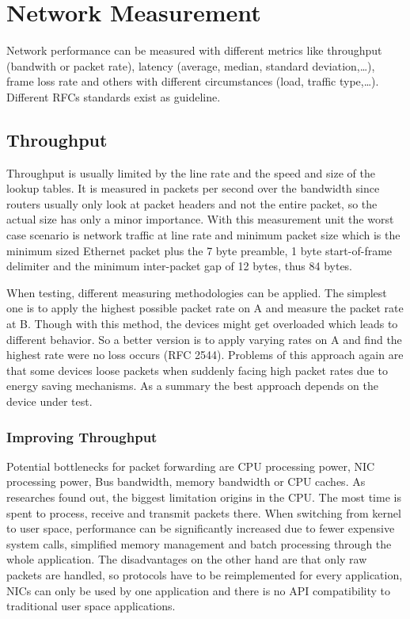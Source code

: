 
\section{Network Measurement}
Network performance can be measured with different metrics like throughput (bandwith or packet rate), latency (average, median, standard deviation,\dots), frame loss rate and others with different circumstances (load, traffic type,\dots).
Different RFCs standards exist as guideline.

\subsection{Throughput}
Throughput is usually limited by the line rate and the speed and size of the lookup tables.
It is measured in packets per second over the bandwidth since routers usually only look at packet headers and not the entire packet, so the actual size has only a minor importance.
With this measurement unit the worst case scenario is network traffic at line rate and minimum packet size which is the minimum sized Ethernet packet plus the 7 byte preamble, 1 byte start-of-frame delimiter and the minimum inter-packet gap of 12 bytes, thus 84 bytes.\\
\vspace{5pt}

When testing, different measuring methodologies can be applied.
The simplest one is to apply the highest possible packet rate on A and measure the packet rate at B.
Though with this method, the devices might get overloaded which leads to different behavior.
So a better version is to apply varying rates on A and find the highest rate were no loss occurs (RFC 2544).
Problems of this approach again are that some devices loose packets when suddenly facing high packet rates due to energy saving mechanisms.
As a summary the best approach depends on the device under test.

\subsubsection*{Improving Throughput}
Potential bottlenecks for packet forwarding are CPU processing power, NIC processing power, Bus bandwidth, memory bandwidth or CPU caches.
As researches found out, the biggest limitation origins in the CPU.
The most time is spent to process, receive and transmit packets there.
When switching from kernel to user space, performance can be significantly increased due to fewer expensive system calls, simplified memory management and batch processing through the whole application.
The disadvantages on the other hand are that only raw packets are handled, so protocols have to be reimplemented for every application, NICs can only be used by one application and there is no API compatibility to traditional user space applications.

